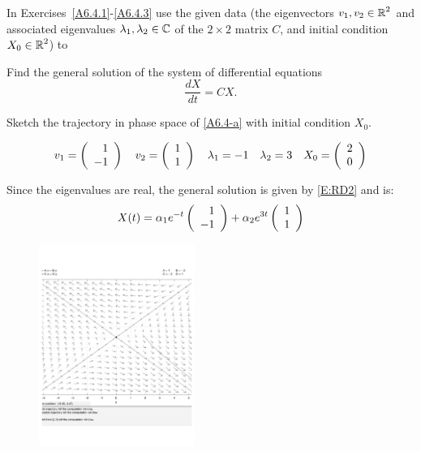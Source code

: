 \documentclass{ximera}
\begin{document}
In Exercises~\ref{A6.4.1}-\ref{A6.4.3} use the given data (the eigenvectors 
$v_1,v_2\in\mbox{$\mathbb{R}$}^2$ and associated eigenvalues $\lambda_1,\lambda_2\in\mbox{$\mathbb{C}$}$
of the $2\times 2$ matrix $C$, and initial condition $X_0\in\mbox{$\mathbb{R}$}^2$) to   
\begin{enumeratea}
\item Find the general solution of the system of differential equations 
\begin{equation} \label{A6.4-a}
\frac{dX}{dt} = CX. 
\end{equation}
\item Sketch the trajectory in phase space of \eqref{A6.4-a} with initial condition $X_0$.
\end{enumeratea}

\begin{exercise} \label{A6.4.1}
\[
v_1 = \left(\begin{array}{rrrrrrrrrrrrrrrrrr}  1 \\ -1 \end{array}\right) \quad  v_2 = \left(\begin{array}{rrrrrrrrrrrrrrrrrr}  1 \\ 1  \end{array}\right)\quad  \lambda_1 = -1\quad \lambda_2 = 3\quad  X_0 = \left(\begin{array}{rrrrrrrrrrrrrrrrrr} 2 \\ 0  \end{array}\right)
\]

\begin{solution}
\soln Since the eigenvalues are real, the general solution is given by \eqref{E:RD2} and is:
\[
X(t) = \alpha_1 e^{-t} \left(\begin{array}{rrrrrrrrrrrrrrrrrr}  1 \\ -1 \end{array}\right) + \alpha_2 e^{3t}\left(\begin{array}{rrrrrrrrrrrrrrrrrr}  1 \\ 1  \end{array}\right)
\]
 
\begin{figure}[htb]
           \centerline{%
           \includegraphics[width=2.0in]{exfigure/A6_4_1a.pdf}}
\end{figure}

\end{solution}
\end{exercise}
\end{document}
